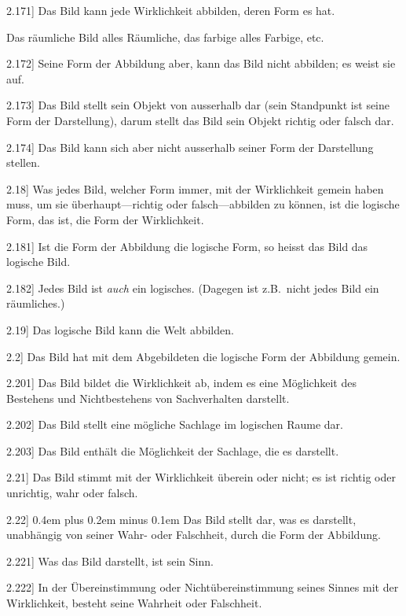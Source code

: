 \documentclass[12pt,oneside]{book}[2007/10/19]
\newcommand{\PropERef}[1]{\hyperref[PropE:#1]{#1}}
\newcommand{\PropositionG}[2]{%
  \item[\phantomsection\label{PropG:#1}\PropERef{#1}] #2%
}
\newcommand{\Emph}[1]{\emph{#1}}%
\newcommand{\zumBeispiel}{z.\;B.}
\newcommand{\stretchyspace}{\spaceskip0.4em plus 0.2em minus 0.1em}
\begin{document}
\begin{propositions}
\PropositionG{2.171}
{Das Bild kann jede Wirklichkeit abbilden,
deren Form es hat.

Das räumliche Bild alles Räumliche, das farbige
alles Farbige, etc.}


\PropositionG{2.172}
{Seine Form der Abbildung aber, kann das Bild
nicht abbilden; es weist sie auf.}


\PropositionG{2.173}
{Das Bild stellt sein Objekt von ausserhalb dar
(sein Standpunkt ist seine Form der Darstellung),
darum stellt das Bild sein Objekt richtig oder
falsch dar.}


\PropositionG{2.174}
{Das Bild kann sich aber nicht ausserhalb seiner
Form der Darstellung stellen.}


\PropositionG{2.18}
{Was jedes Bild, welcher Form immer, mit der
Wirklichkeit gemein haben muss, um sie überhaupt---richtig
oder falsch---ab\-bil\-den zu können,
ist die logische Form, das ist, die Form der
Wirklichkeit.}


\PropositionG{2.181}
{Ist die Form der Abbildung die logische Form,
so heisst das Bild das logische Bild.}


\PropositionG{2.182}
{Jedes Bild ist \Emph{auch} ein logisches. (Dagegen
ist \zumBeispiel\ nicht jedes Bild ein räumliches.)}


\PropositionG{2.19}
{Das logische Bild kann die Welt abbilden.}


\PropositionG{2.2}
{Das Bild hat mit dem Abgebildeten die logische
Form der Abbildung gemein.}


\PropositionG{2.201}
{Das Bild bildet die Wirklichkeit ab, indem es
eine Möglichkeit des Bestehens und Nichtbestehens
von Sachverhalten darstellt.}


\PropositionG{2.202}
{Das Bild stellt eine mögliche Sachlage im
logischen Raume dar.}


\PropositionG{2.203}
{Das Bild enthält die Möglichkeit der Sachlage,
die es darstellt.}


\PropositionG{2.21}
{Das Bild stimmt mit der Wirklichkeit überein
oder nicht; es ist richtig oder unrichtig, wahr
oder falsch.}


\PropositionG{2.22}
{{\stretchyspace
Das Bild stellt dar, was es darstellt, unabhängig
von seiner Wahr- oder Falschheit, durch die Form
der Abbildung.}}


\PropositionG{2.221}
{Was das Bild darstellt, ist sein Sinn.}


\PropositionG{2.222}
{In der Übereinstimmung oder Nichtübereinstimmung
seines Sinnes mit der Wirklichkeit,
besteht seine Wahrheit oder Falschheit.}



\end{propositions}
\end{document}
